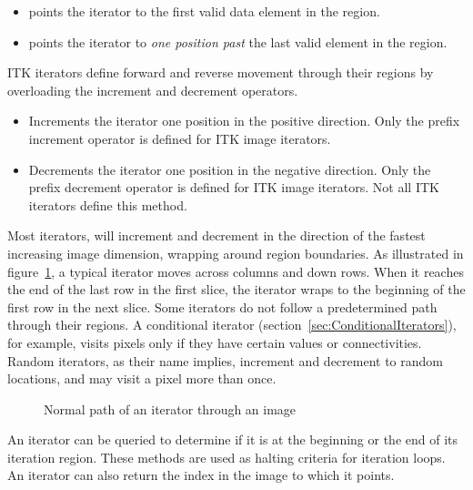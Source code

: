 \begin{itemize}
\item \textbf{} points the iterator to the first valid
data element in the region.

\item \textbf{} points the iterator to \emph{one position past}
the last valid element in the region.
\end{itemize}

ITK iterators define forward and reverse movement through their regions by
overloading the increment and decrement operators.

\begin{itemize}
\item \textbf{} Increments the iterator one position in the
positive direction.  Only the prefix increment operator is defined for ITK image
iterators.

\item \textbf{} Decrements the iterator one position in the
negative direction.  Only the prefix decrement operator is defined for ITK
image iterators. Not all ITK iterators define this method.
\end{itemize}

Most iterators, will increment and decrement in the direction of the fastest
increasing image dimension, wrapping around region boundaries.  As illustrated
in figure~{\ref{fig:WalkingIterator}}, a typical iterator moves across columns
and down rows.  When it reaches the end of the last row in the first slice, the
iterator wraps to the beginning of the first row in the next slice.  Some
iterators do not follow a predetermined path through their regions.  A
conditional iterator (section~\ref{sec:ConditionalIterators}), for example,
visits pixels only if they have certain values or connectivities.  Random
iterators, as their name implies, increment and decrement to random locations,
and may visit a pixel more than once.

\begin{figure}
\centering
\caption[Normal iterator path.]{Normal path of an iterator through an image}
\protect\label{fig:WalkingIterator}
\end{figure}


An iterator can be queried to determine if it is at the beginning or the end of
its iteration region.  These methods are used as halting criteria for iteration
loops.  An iterator can also return the index in the image to which it points.

